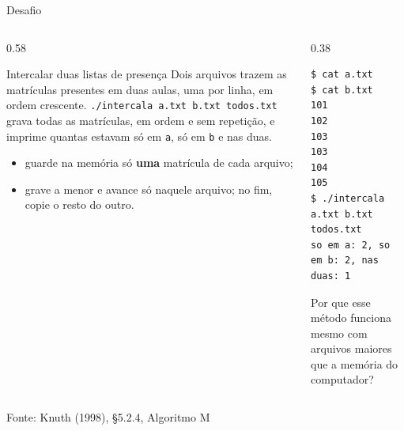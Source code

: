 \documentclass[aspectratio=169]{beamer}
\newcommand{\fonte}[1]{\vfill\hfill{\scriptsize\textcolor{UFSGray}{Fonte: #1}}}
\begin{document}
\begin{frame}[fragile]{Desafio}
  \vspace{-0.4em}
  \begin{columns}[T]
    \begin{column}{0.58\textwidth}
      \begin{block}{Intercalar duas listas de presença}
        \small Dois arquivos trazem as matrículas presentes em duas aulas,
        uma por linha, em ordem crescente.
        \texttt{./intercala a.txt b.txt todos.txt} grava todas as
        matrículas, em ordem e sem repetição, e imprime quantas estavam só
        em \texttt{a}, só em \texttt{b} e nas duas.
        \vspace{-0.3em}
        \begin{itemize}
          \item guarde na memória só \textbf{uma} matrícula de cada arquivo;
          \item grave a menor e avance só naquele arquivo; no fim, copie o
            resto do outro.
        \end{itemize}
      \end{block}
    \end{column}
    \begin{column}{0.38\textwidth}
\begin{lstlisting}[style=shellS, language={}]
$ cat a.txt        $ cat b.txt
101                102
103                103
104                105
$ ./intercala a.txt b.txt todos.txt
so em a: 2, so em b: 2, nas duas: 1
\end{lstlisting}
      \raggedright\small Por que esse método funciona mesmo com arquivos
      maiores que a memória do computador?
    \end{column}
  \end{columns}
  \fonte{Knuth (1998), §5.2.4, Algoritmo M~\cite{knuth1998art}}
\end{frame}
\end{document}
